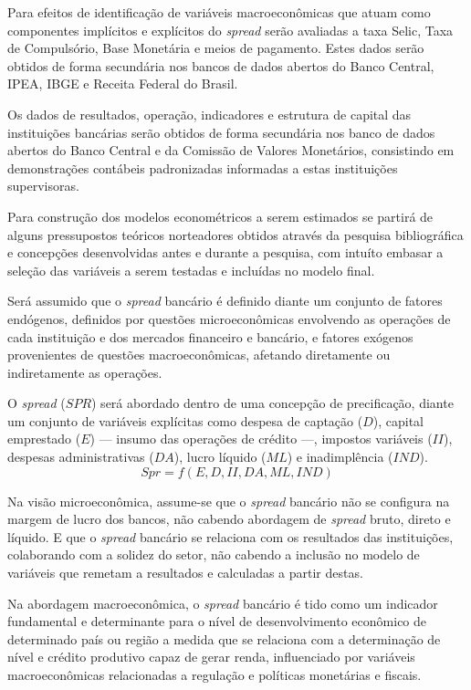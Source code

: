 \documentclass[12pt,12pt,openright,oneside,a4paper,chapter=TITLE,section=TITLE,subsection=TITLE,subsubsection=TITLE,english,french,spanish,portugues,sumario=tradicional]{abntex2}
\begin{document}
Para efeitos de identificação de variáveis macroeconômicas que atuam como componentes implícitos e explícitos do \emph{spread} serão avaliadas a taxa Selic, Taxa de Compulsório, Base Monetária e meios de pagamento. Estes dados serão obtidos de forma secundária nos bancos de dados abertos do Banco Central, IPEA, IBGE e Receita Federal do Brasil.

Os dados de resultados, operação, indicadores e estrutura de capital das instituições bancárias serão obtidos de forma secundária nos banco de dados abertos do Banco Central e da Comissão de Valores Monetários, consistindo em demonstrações contábeis padronizadas informadas a estas instituições supervisoras.

Para construção dos modelos econométricos a serem estimados se partirá de alguns pressupostos teóricos norteadores obtidos através da pesquisa bibliográfica e concepções desenvolvidas antes e durante a pesquisa, com intuíto embasar a seleção das variáveis a serem testadas e incluídas no modelo final.

Será assumido que o \emph{spread} bancário é definido diante um conjunto de fatores endógenos, definidos por questões microeconômicas envolvendo as operações de cada instituição e dos mercados financeiro e bancário, e fatores exógenos provenientes de questões macroeconômicas, afetando diretamente ou indiretamente as operações.

O \emph{spread} (\(SPR\)) será abordado dentro de uma concepção de precificação, diante um conjunto de variáveis explícitas como despesa de captação (\(D\)), capital emprestado (\(E\)) --- insumo das operações de crédito ---, impostos variáveis (\(II\)), despesas administrativas (\(DA\)), lucro líquido (\(ML\)) e inadimplência (\(IND\)).
\[
Spr = f(E,D,II,DA,ML,IND)
\]

Na visão microeconômica, assume-se que o \emph{spread} bancário não se configura na margem de lucro dos bancos, não cabendo abordagem de \emph{spread} bruto, direto e líquido. E que o \emph{spread} bancário se relaciona com os resultados das instituições, colaborando com a solidez do setor, não cabendo a inclusão no modelo de variáveis que remetam a resultados e calculadas a partir destas.

Na abordagem macroeconômica, o \emph{spread} bancário é tido como um indicador fundamental e determinante para o nível de desenvolvimento econômico de determinado país ou região a medida que se relaciona com a determinação de nível e crédito produtivo capaz de gerar renda, influenciado por variáveis macroeconômicas relacionadas a regulação e políticas monetárias e fiscais.
\end{document}
